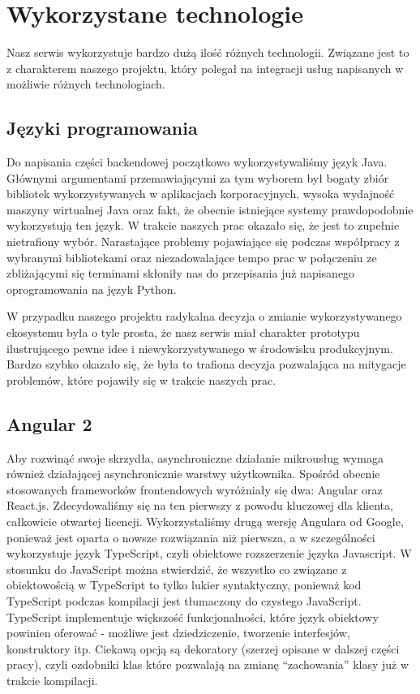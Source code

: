 \documentclass[licencjacka]{pracamgr}
\begin{document}
\chapter{Wykorzystane technologie}

Nasz serwis wykorzystuje bardzo dużą ilość różnych technologii. Związane jest to
z charakterem naszego projektu, który polegał na integracji usług napisanych w
możliwie różnych technologiach.

\section{Języki programowania}


Do napisania części backendowej początkowo wykorzystywaliśmy język Java. Głównymi
argumentami przemawiającymi za tym wyborem był bogaty zbiór bibliotek wykorzystywanych
w aplikacjach korporacyjnych, wysoka wydajność maszyny wirtualnej Java oraz fakt, że
obecnie istniejące systemy prawdopodobnie wykorzystują ten język. W trakcie naszych
prac okazało się, że jest to zupełnie nietrafiony wybór. Narastające problemy
pojawiające się podczas współpracy z wybranymi bibliotekami oraz niezadowalające
tempo prac w połączeniu ze zbliżającymi się terminami skłoniły nas do przepisania
już napisanego oprogramowania na język Python.

W przypadku naszego projektu radykalna decyzja o zmianie wykorzystywanego ekosystemu
była o tyle prosta, że nasz serwis miał charakter prototypu ilustrującego pewne
idee i niewykorzystywanego w środowisku produkcyjnym. Bardzo szybko okazało się, że
była to trafiona decyzja pozwalająca na mitygacje problemów, które pojawiły się w
trakcie naszych prac.

\section{Angular 2}

Aby rozwinąć swoje skrzydła, asynchroniczne działanie mikrousług wymaga również działającej asynchronicznie warstwy użytkownika.
Spośród obecnie stosowanych frameworków frontendowych wyróżniały się dwa: Angular oraz React.js.
Zdecydowaliśmy się na ten pierwszy z powodu kluczowej dla klienta, całkowicie otwartej licencji.
Wykorzystaliśmy drugą wersję Angulara od Google, ponieważ jest oparta o nowsze rozwiązania niż pierwsza,
a w szczególności wykorzystuje język TypeScript, czyli obiektowe rozszerzenie języka Javascript.
W stosunku do JavaScript można stwierdzić, że wszystko co związane z obiektowością
w TypeScript to tylko lukier syntaktyczny, ponieważ kod TypeScript podczas kompilacji
jest tłumaczony do czystego JavaScript. TypeScript implementuje większość
funkcjonalności, które język obiektowy powinien oferować - możliwe jest dziedziczenie,
tworzenie interfesjów, konstruktory itp. Ciekawą opcją są dekoratory (szerzej opisane
w dalszej części pracy), czyli ozdobniki klas które pozwalają na zmianę ``zachowania''
klasy już w trakcie kompilacji.
\end{document}
